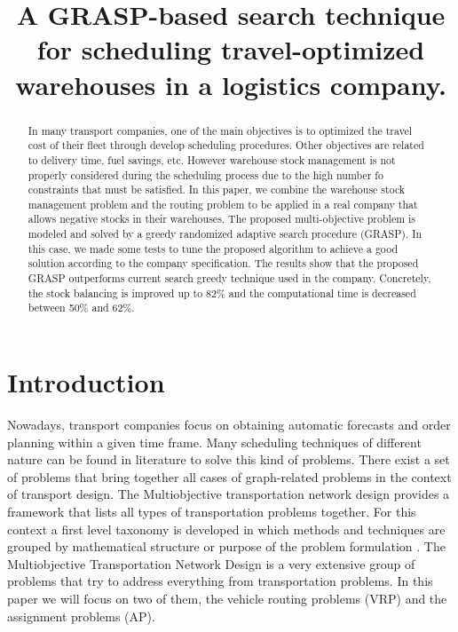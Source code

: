 \documentclass[letterpaper]{article} %
\title{A GRASP-based search technique for scheduling travel-optimized warehouses in a logistics company.}
\author{}
\begin{document}
\maketitle

\begin{abstract}
In many transport companies, one of the main objectives is to optimized the travel cost of their fleet through develop scheduling procedures. Other objectives are related to delivery time, fuel savings, etc. However warehouse stock management is not properly considered during the scheduling process due to the high number fo constraints that must be satisfied. In this paper, we combine the warehouse stock management problem and the routing problem to be applied in a real company that allows negative stocks in their warehouses. The proposed multi-objective problem is modeled and solved by a greedy randomized adaptive search procedure (GRASP). In this case, we made some tests to tune the proposed algorithm to achieve a good solution according to the company specification. The results show that the proposed GRASP outperforms current search greedy technique used in the company. Concretely, the stock balancing is improved up to 82\% and the computational time is decreased between 50\% and 62\%.
\end{abstract}

\section{Introduction}

Nowadays, transport companies focus on obtaining automatic forecasts and order planning within a given time frame. Many scheduling techniques of different nature can be found in literature to solve this kind of problems. There exist a set of problems that bring together all cases of graph-related problems in the context of transport design. The Multiobjective transportation network design provides a framework that lists all types of transportation problems together. For this context a first level taxonomy is developed in which methods and techniques are grouped by mathematical structure or purpose of the problem formulation \cite{Current1993}.
The Multiobjective Transportation Network Design is a very extensive group of problems that try to address everything from transportation problems. In this paper we will focus on two of them, the vehicle routing problems (VRP) and the assignment problems (AP).
\end{document}

